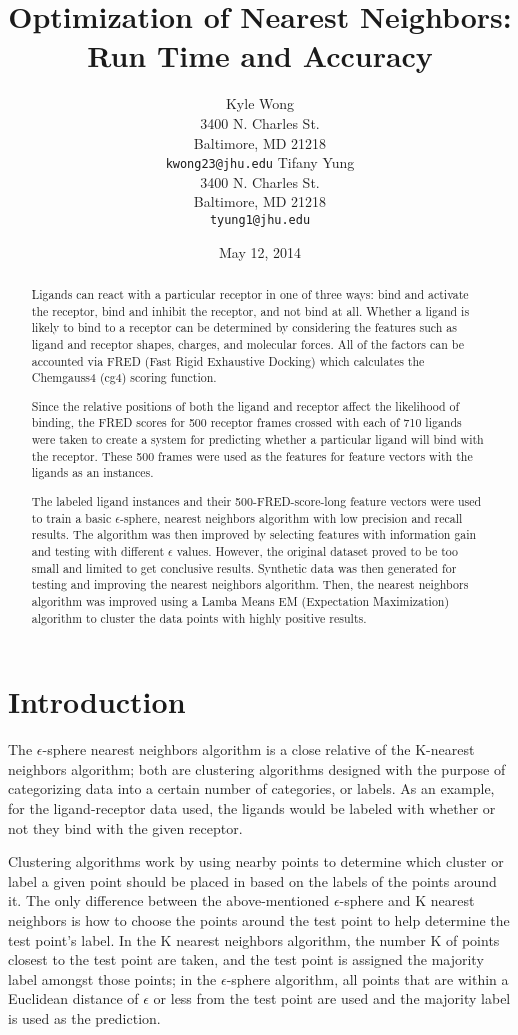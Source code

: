 \documentclass[11pt,letterpaper]{article}
\title{Optimization of Nearest Neighbors: Run Time and Accuracy}
\author{Kyle Wong \\
  3400 N. Charles St. \\
  Baltimore, MD 21218 \\
  {\tt kwong23@jhu.edu}
  \And
  Tifany Yung \\
  3400 N. Charles St. \\
  Baltimore, MD 21218 \\
  {\tt tyung1@jhu.edu}}
\date{May 12, 2014}
\begin{document}
\maketitle
\begin{abstract}
Ligands can react with a particular receptor in one of three ways: bind and activate the receptor, bind and inhibit the receptor, and not bind at all. Whether a ligand is likely to bind to a receptor can be determined by considering the features such as ligand and receptor shapes, charges, and molecular forces. All of the factors can be accounted via FRED (Fast Rigid Exhaustive Docking) which calculates the Chemgauss4 (cg4) scoring function.

Since the relative positions of both the ligand and receptor affect the likelihood of binding, the FRED scores for 500 receptor frames crossed with each of 710 ligands were taken to create a system for predicting whether a particular ligand will bind with the receptor. These 500 frames were used as the features for feature vectors with the ligands as an instances.

The labeled ligand instances and their 500-FRED-score-long feature vectors were used to train a basic $\epsilon$-sphere, nearest neighbors algorithm with low precision and recall results. The algorithm was then improved by selecting features with information gain and testing with different $\epsilon$ values.  However, the original dataset proved to be too small and limited to get conclusive results.  Synthetic data was then generated for testing and improving the nearest neighbors algorithm.  Then, the nearest neighbors algorithm was improved using a Lamba Means EM (Expectation Maximization) algorithm to cluster the data points with highly positive results.  
\end{abstract}

\section{Introduction}

The $\epsilon$-sphere nearest neighbors algorithm is a close relative of the K-nearest neighbors algorithm; both are clustering algorithms designed with the purpose of categorizing data into a certain number of categories, or labels. As an example, for the ligand-receptor data used, the ligands would be labeled with whether or not they bind with the given receptor.

Clustering algorithms work by using nearby points to determine which cluster or label a given point should be placed in based on the labels of the points around it. The only difference between the above-mentioned $\epsilon$-sphere and K nearest neighbors is how to choose the points around the test point to help determine the test point's label. In the K nearest neighbors algorithm, the number K of points closest to the test point are taken, and the test point is assigned the majority label amongst those points; in the $\epsilon$-sphere algorithm, all points that are within a Euclidean distance of $\epsilon$ or less from the test point are used and the majority label is used as the prediction.
\end{document}
